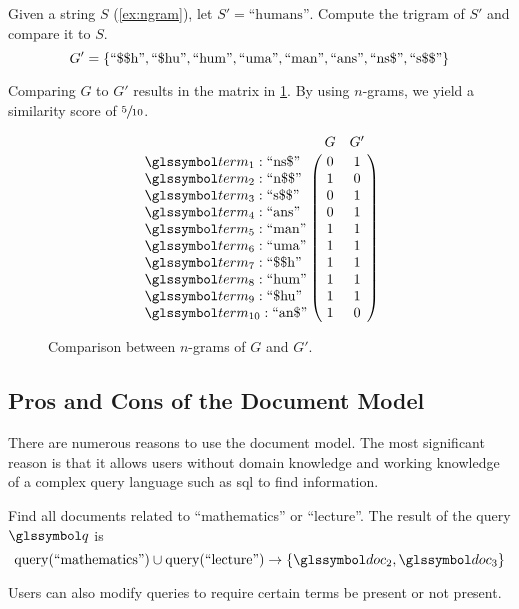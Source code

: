		\begin{ex}
		\label{ex:n-gram-comparison}
			Given a string \(S\) (\cref{ex:ngram}), let \(S' = \text{``humans''}\).  Compute the trigram of \(S'\) and compare it to \(S\).
			\[
				G' = \{
					\text{``\char"24\char"24h''},
					\text{``\char"24hu''},
					\text{``hum''},
					\text{``uma''},
					\text{``man''},
					\text{``ans''},
					\text{``ns\char"24''},
					\text{``s\char"24\char"24''}
				\}
			\]
			
			Comparing \(G\) to \(G'\) results in the matrix in \cref{fig:n-gram-misspelling-comparison}.  By using \(n\)-grams, we yield a similarity score of \(\sfrac{5}{10}\).
			
			\begin{figure}
				\[
					\bordermatrix{
						~ & G & G' \cr
						\term_{1} : \text{``ns\char"24''} & 0 & 1 \cr
						\term_{2} : \text{``n\char"24\char"24''} & 1 & 0 \cr
						\term_{3} : \text{``s\char"24\char"24''} & 0 & 1 \cr
						\term_{4} : \text{``ans''} & 0 & 1 \cr
						\term_{5} : \text{``man''} & 1 & 1 \cr
						\term_{6} : \text{``uma''} & 1 & 1 \cr
						\term_{7} : \text{``\char"24\char"24h''} & 1 & 1 \cr
						\term_{8} : \text{``hum''} & 1 & 1 \cr
						\term_{9} : \text{``\char"24hu''} & 1 & 1 \cr
						\term_{10} : \text{``an\char"24''} & 1 & 0 \cr
					}
				\]
				
				\caption{Comparison between \(n\)-grams of \(G\) and \(G'\).}
				\label{fig:n-gram-misspelling-comparison}
			\end{figure}
		\end{ex}
			
	\subsection{Pros and Cons of the Document Model}
	\label{sec:pros-cons-document-model}
		There are numerous reasons to use the document model.  The most significant reason is that it allows users without domain knowledge and working knowledge of a complex query language such as \gls{sql} to find information.
		
		\begin{ex}
			Find all documents related to ``mathematics'' or ``lecture''.  The result of the query \(\q\) is
			\[
				\query(\text{``mathematics''}) \cup \query(\text{``lecture''}) \rightarrow \{\doc_2, \doc_3\}
			\]
		\end{ex}
		
		Users can also modify queries to require certain terms be present or not present.
		
